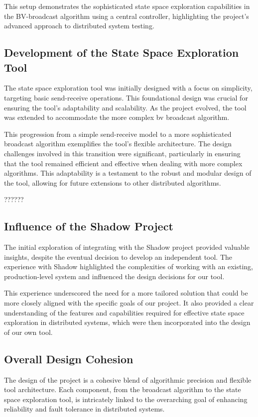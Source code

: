 \documentclass[a4paper,11pt,oneside]{report}
\begin{document}
This setup demonstrates the sophisticated state space exploration capabilities in the BV-broadcast algorithm using a central controller, highlighting the project's advanced approach to distributed system testing.


\subsection{Development of the State Space Exploration Tool}
The state space exploration tool was initially designed with a focus on simplicity, targeting basic send-receive operations. This foundational design was crucial for ensuring the tool's adaptability and scalability. As the project evolved, the tool was extended to accommodate the more complex bv broadcast algorithm. 

This progression from a simple send-receive model to a more sophisticated broadcast algorithm exemplifies the tool's flexible architecture. The design challenges involved in this transition were significant, particularly in ensuring that the tool remained efficient and effective when dealing with more complex algorithms. This adaptability is a testament to the robust and modular design of the tool, allowing for future extensions to other distributed algorithms.


??????
\subsection{Influence of the Shadow Project}
The initial exploration of integrating with the Shadow project provided valuable insights, despite the eventual decision to develop an independent tool. The experience with Shadow highlighted the complexities of working with an existing, production-level system and influenced the design decisions for our tool. 

This experience underscored the need for a more tailored solution that could be more closely aligned with the specific goals of our project. It also provided a clear understanding of the features and capabilities required for effective state space exploration in distributed systems, which were then incorporated into the design of our own tool.


\subsection{Overall Design Cohesion}
The design of the project is a cohesive blend of algorithmic precision and flexible tool architecture. Each component, from the broadcast algorithm to the state space exploration tool, is intricately linked to the overarching goal of enhancing reliability and fault tolerance in distributed systems. 
\end{document}
